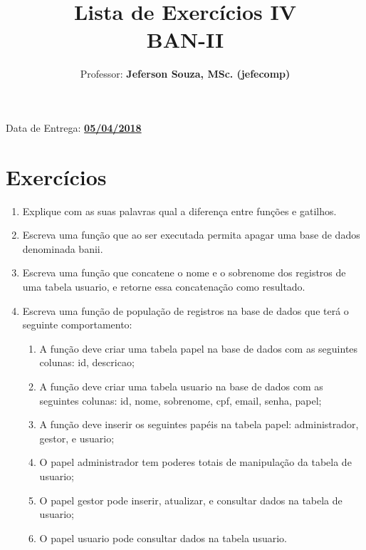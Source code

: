 \documentclass[12pt]{article}
\title{Lista de Exercícios IV\\
BAN-II}
\author{Professor: \textbf{Jeferson Souza, MSc. (jefecomp)}}
\begin{document}
\date{}

\maketitle

\begin{center}
Data de Entrega: \textbf{\underline{05/04/2018}}
\end{center}

\section*{Exercícios}

\begin{enumerate}
\itemsep 10mm

\item Explique com as suas palavras qual a diferença entre funções e gatilhos.

\item Escreva uma função que ao ser executada permita apagar uma base de dados denominada banii.

\item Escreva uma função que concatene o nome e o sobrenome dos registros de uma tabela usuario, e retorne essa concatenação como resultado.

\item Escreva uma função de população de registros na base de dados que terá o seguinte comportamento:

\begin{enumerate}

\item A função deve criar uma tabela papel na base de dados com as seguintes colunas: id, descricao;

\item A função deve criar uma tabela usuario na base de dados com as seguintes colunas: id, nome, sobrenome, cpf, email, senha, papel;

\item A função deve inserir os seguintes papéis na tabela papel: administrador, gestor, e usuario;

\item O papel administrador tem poderes totais de manipulação da tabela de usuario;

\item O papel gestor pode inserir, atualizar, e consultar dados na tabela de usuario;

\item O papel usuario pode consultar dados na tabela usuario.


\end{enumerate}
\end{enumerate}
\end{document}
